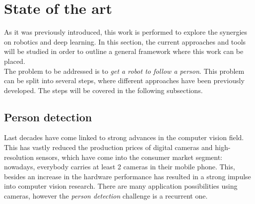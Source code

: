 	
	
\section{State of the art}
\label{sec:1_sota}
	As it was previously introduced, this work is performed to explore the synergies on robotics and deep learning. In this section, the current approaches and tools will be studied in order to outline a general framework where this work can be placed.\\
	
	The problem to be addressed is to \textit{get a robot to follow a person}. This problem can be split into several steps, where different approaches have been previously developed. The steps will be covered in the following subsections.
	
\subsection{Person detection}
Last decades have come linked to strong advances in the computer vision field. This has vastly reduced the production prices of digital cameras and high-resolution sensors, which have come into the consumer market segment: nowadays, everybody carries at least 2 cameras in their mobile phone. This, besides an increase in the hardware performance has resulted in a strong impulse into computer vision research. There are many application possibilities using cameras, however the \textit{person detection} challenge is a recurrent one.\\

